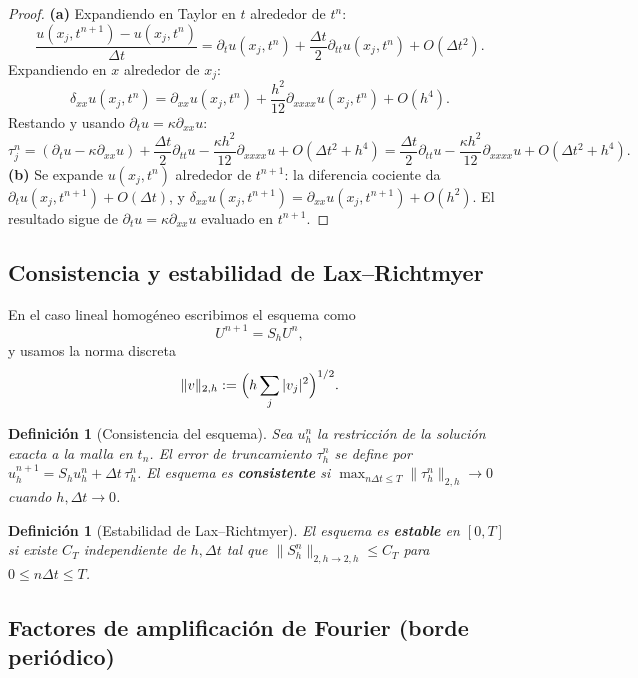 \documentclass[a4paper,11pt]{report}
\newtheorem{definition}[theorem]{Definición}
\begin{document}
\begin{proof}
\textbf{(a)} Expandiendo en Taylor en $t$ alrededor de $t^n$:
\[
  \frac{u(x_j,t^{n+1})-u(x_j,t^n)}{\Delta t}
  = \partial_t u(x_j,t^n) + \frac{\Delta t}{2}\partial_{tt}u(x_j,t^n) + O(\Delta t^2).
\]
Expandiendo en $x$ alrededor de $x_j$:
\[
  \delta_{xx}u(x_j,t^n)
  = \partial_{xx}u(x_j,t^n) + \frac{h^2}{12}\partial_{xxxx}u(x_j,t^n) + O(h^4).
\]
Restando y usando $\partial_t u = \kappa\partial_{xx}u$:
\[
  \tau_j^n
  = (\partial_t u - \kappa\partial_{xx}u)
  + \frac{\Delta t}{2}\partial_{tt}u
  - \frac{\kappa h^2}{12}\partial_{xxxx}u + O(\Delta t^2+h^4)
  = \frac{\Delta t}{2}\partial_{tt}u - \frac{\kappa h^2}{12}\partial_{xxxx}u + O(\Delta t^2+h^4).
\]
\textbf{(b)} Se expande $u(x_j,t^n)$ alrededor de $t^{n+1}$: la diferencia cociente da $\partial_t u(x_j,t^{n+1}) + O(\Delta t)$, y $\delta_{xx}u(x_j,t^{n+1}) = \partial_{xx}u(x_j,t^{n+1}) + O(h^2)$. El resultado sigue de $\partial_t u = \kappa\partial_{xx}u$ evaluado en $t^{n+1}$.
\end{proof}

\subsection{Consistencia y estabilidad de Lax--Richtmyer}

En el caso lineal homogéneo escribimos el esquema como
\[
  U^{n+1}=S_hU^n,
\]
y usamos la norma discreta
\[
  \|v\|_{2,h}:=\Bigl(h\sum_j|v_j|^2\Bigr)^{1/2}.
\]

\begin{definition}[Consistencia del esquema]
Sea $u_h^n$ la restricción de la solución exacta a la malla en $t_n$. El error de truncamiento $\tau_h^n$ se define por $u_h^{n+1}=S_hu_h^n+\Delta t\,\tau_h^n$. El esquema es \textbf{consistente} si $\max_{n\Delta t\le T}\|\tau_h^n\|_{2,h}\to0$ cuando $h,\Delta t\to0$.
\end{definition}

\begin{definition}[Estabilidad de Lax--Richtmyer]
El esquema es \textbf{estable} en $[0,T]$ si existe $C_T$ independiente de $h,\Delta t$ tal que $\|S_h^n\|_{2,h\to2,h}\le C_T$ para $0\le n\Delta t\le T$.
\end{definition}

\subsection{Factores de amplificación de Fourier (borde periódico)}
\end{document}
